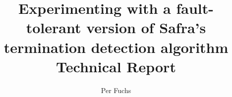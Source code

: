 \documentclass{article}
\title{Experimenting with a fault-tolerant version of Safra's termination detection algorithm 
\newline
\newline
	\large Technical Report}
\author{Per Fuchs}
\begin{document}
	\maketitle
	

	
	
	
	
	
	\nocite{*}
	\printbibliography
\end{document}
